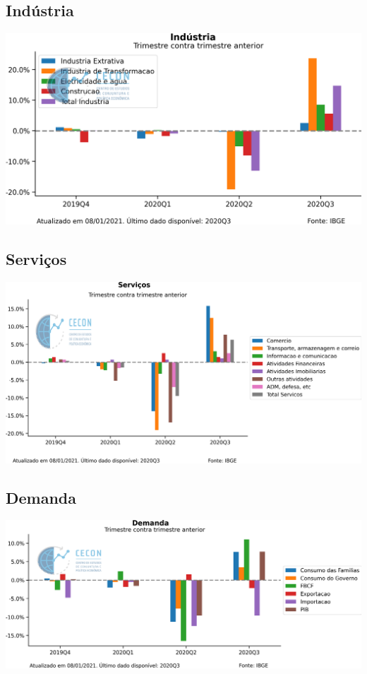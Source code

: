 \documentclass{SelfArx}
\begin{document}
\subsection*{Indústria}
\label{sec:org705f614}

\begin{center}
\includegraphics[width=.9\linewidth]{./figs/PIB/Industria.png}
\end{center}


\subsection*{Serviços}
\label{sec:org5cf4272}

\begin{center}
\includegraphics[width=.9\linewidth]{./figs/PIB/Servicos.png}
\end{center}

\subsection*{Demanda}
\label{sec:orgeb446d2}

\begin{center}
\includegraphics[width=.9\linewidth]{./figs/PIB/Demanda.png}
\end{center}
\end{document}
